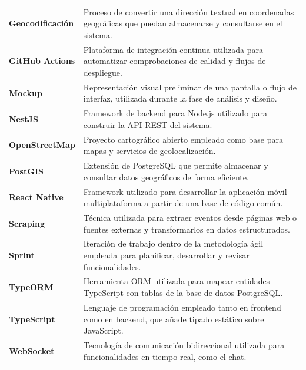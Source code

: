 \begin{longtable}{p{}p{}}
\textbf{Geocodificación} & Proceso de convertir una dirección textual en coordenadas geográficas que puedan almacenarse y consultarse en el sistema. \\

\textbf{GitHub Actions} & Plataforma de integración continua utilizada para automatizar comprobaciones de calidad y flujos de despliegue. \\

\textbf{Mockup} & Representación visual preliminar de una pantalla o flujo de interfaz, utilizada durante la fase de análisis y diseño. \\

\textbf{NestJS} & Framework de backend para Node.js utilizado para construir la API REST del sistema. \\

\textbf{OpenStreetMap} & Proyecto cartográfico abierto empleado como base para mapas y servicios de geolocalización. \\

\textbf{PostGIS} & Extensión de PostgreSQL que permite almacenar y consultar datos geográficos de forma eficiente. \\

\textbf{React Native} & Framework utilizado para desarrollar la aplicación móvil multiplataforma a partir de una base de código común. \\

\textbf{Scraping} & Técnica utilizada para extraer eventos desde páginas web o fuentes externas y transformarlos en datos estructurados. \\

\textbf{Sprint} & Iteración de trabajo dentro de la metodología ágil empleada para planificar, desarrollar y revisar funcionalidades. \\

\textbf{TypeORM} & Herramienta ORM utilizada para mapear entidades TypeScript con tablas de la base de datos PostgreSQL. \\

\textbf{TypeScript} & Lenguaje de programación empleado tanto en frontend como en backend, que añade tipado estático sobre JavaScript. \\

\textbf{WebSocket} & Tecnología de comunicación bidireccional utilizada para funcionalidades en tiempo real, como el chat. \\
\end{longtable}
